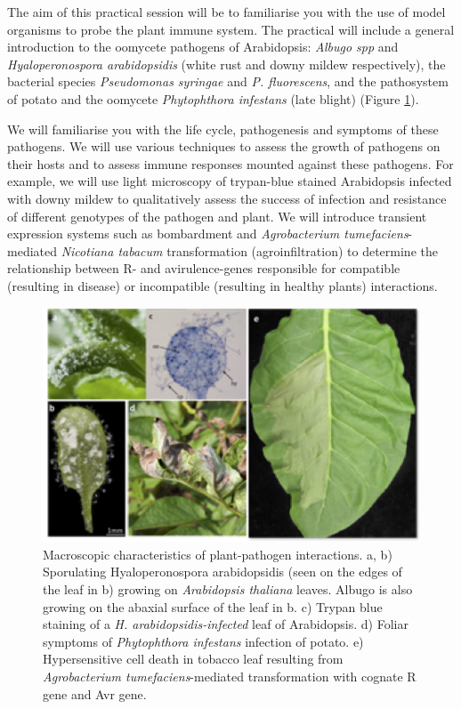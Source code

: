 \documentclass[12pt,]{book}
\theoremstyle{definition}
\theoremstyle{definition}
\theoremstyle{remark}
\begin{document}
The aim of this practical session will be to familiarise you with the
use of model organisms to probe the plant immune system. The practical
will include a general introduction to the oomycete pathogens of
Arabidopsis: \emph{Albugo spp} and \emph{Hyaloperonospora arabidopsidis}
(white rust and downy mildew respectively), the bacterial species
\emph{Pseudomonas syringae} and \emph{P. fluorescens}, and the
pathosystem of potato and the oomycete \emph{Phytophthora infestans}
(late blight) (Figure \ref{fig:leaves}).

We will familiarise you with the life cycle, pathogenesis and symptoms
of these pathogens. We will use various techniques to assess the growth
of pathogens on their hosts and to assess immune responses mounted
against these pathogens. For example, we will use light microscopy of
trypan-blue stained Arabidopsis infected with downy mildew to
qualitatively assess the success of infection and resistance of
different genotypes of the pathogen and plant. We will introduce
transient expression systems such as bombardment and \emph{Agrobacterium
tumefaciens}-mediated \emph{Nicotiana tabacum} transformation
(agroinfiltration) to determine the relationship between R- and
avirulence-genes responsible for compatible (resulting in disease) or
incompatible (resulting in healthy plants) interactions.











\begin{figure}
\includegraphics[width=6.48in]{assets/jones_fig2_prac} \caption{Macroscopic characteristics of plant-pathogen
interactions. a, b) Sporulating Hyaloperonospora arabidopsidis (seen on
the edges of the leaf in b) growing on \emph{Arabidopsis thaliana}
leaves. Albugo is also growing on the abaxial surface of the leaf in b.
c) Trypan blue staining of a \emph{H. arabidopsidis-infected} leaf of
Arabidopsis. d) Foliar symptoms of \emph{Phytophthora infestans}
infection of potato. e) Hypersensitive cell death in tobacco leaf
resulting from \emph{Agrobacterium tumefaciens}-mediated transformation
with cognate R gene and Avr gene.}\label{fig:leaves}
\end{figure}
\end{document}

